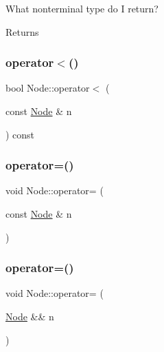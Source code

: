 What nonterminal type do I return? \begin{DoxyReturn}{Returns}

\end{DoxyReturn}
\mbox{\label{class_node_a8b05feb361beb04d465619751a2297b1}} 
\subsubsection{\texorpdfstring{operator$<$()}{operator<()}}
{\footnotesize\ttfamily bool Node\+::operator$<$ (\begin{DoxyParamCaption}\item[{const \hyperlink{class_node}{Node} \&}]{n }\end{DoxyParamCaption}) const\hspace{0.3cm}{\ttfamily [inline]}}

\mbox{\label{class_node_addbfe90949f473c91203389f48095cf0}} 
\subsubsection{\texorpdfstring{operator=()}{operator=()}\hspace{0.1cm}{\footnotesize\ttfamily [1/2]}}
{\footnotesize\ttfamily void Node\+::operator= (\begin{DoxyParamCaption}\item[{const \hyperlink{class_node}{Node} \&}]{n }\end{DoxyParamCaption})\hspace{0.3cm}{\ttfamily [inline]}}

\mbox{\label{class_node_abcd5c8ca2ea54716a72f7e27f9a9c937}} 
\subsubsection{\texorpdfstring{operator=()}{operator=()}\hspace{0.1cm}{\footnotesize\ttfamily [2/2]}}
{\footnotesize\ttfamily void Node\+::operator= (\begin{DoxyParamCaption}\item[{\hyperlink{class_node}{Node} \&\&}]{n }\end{DoxyParamCaption})\hspace{0.3cm}{\ttfamily [inline]}}

